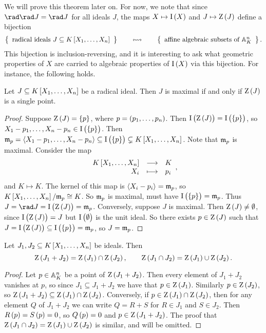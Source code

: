 
We will prove this theorem later on. For now, we note that since $ \rad \rad J = \rad J $ for all ideals $ J $, the maps $ X \mapsto \I\br{X} $ and $ J \mapsto \Z\br{J} $ define a bijection
$$ \correspondence{\text{radical ideals} \ J \subseteq K\sbr{X_1, \dots, X_n}}{\text{affine algebraic subsets of} \ \AA_K^n}. $$
This bijection is inclusion-reversing, and it is interesting to ask what geometric properties of $ X $ are carried to algebraic properties of $ \I\br{X} $ via this bijection. For instance, the following holds.

\begin{proposition}
Let $ J \subseteq K\sbr{X_1, \dots, X_n} $ be a radical ideal. Then $ J $ is maximal if and only if $ \Z\br{J} $ is a single point.
\end{proposition}

\begin{proof}
Suppose $ \Z\br{J} = \cbr{p} $, where $ p = \br{p_1, \dots, p_n} $. Then $ \I\br{\Z\br{J}} = \I\br{\cbr{p}} $, so $ X_1 - p_1, \dots, X_n - p_n \in \I\br{\cbr{p}} $. Then $ \mmm_p = \abr{X_1 - p_1, \dots, X_n - p_n} \subseteq \I\br{\cbr{p}} \subsetneq K\sbr{X_1, \dots, X_n} $. Note that $ \mmm_p $ is maximal. Consider the map
$$ \function{K\sbr{X_1, \dots, X_n}}{K}{X_i}{p_i}, $$
and $ K \mapsto K $. The kernel of this map is $ \abr{X_i - p_i} = \mmm_p $, so $ K\sbr{X_1, \dots, X_n} / \mmm_p \cong K $. So $ \mmm_p $ is maximal, must have $ \I\br{\cbr{p}} = \mmm_p $. Thus $ J = \rad J = \I\br{\Z\br{J}} = \mmm_p $. Conversely, suppose $ J $ is maximal. Then $ \Z\br{J} \ne \emptyset $, since $ \I\br{\Z\br{J}} = J $ but $ \I\br{\emptyset} $ is the unit ideal. So there exists $ p \in \Z\br{J} $ such that $ J = \I\br{\Z\br{J}} \subseteq \I\br{\cbr{p}} = \mmm_p $, so $ J = \mmm_p $.
\end{proof}

\begin{proposition}
Let $ J_1, J_2 \subseteq K\sbr{X_1, \dots, X_n} $ be ideals. Then
$$ \Z\br{J_1 + J_2} = \Z\br{J_1} \cap \Z\br{J_2}, \qquad \Z\br{J_1 \cap J_2} = \Z\br{J_1} \cup \Z\br{J_2}. $$
\end{proposition}

\begin{proof}
Let $ p \in \AA_K^n $ be a point of $ \Z\br{J_1 + J_2} $. Then every element of $ J_1 + J_2 $ vanishes at $ p $, so since $ J_1 \subseteq J_1 + J_2 $ we have that $ p \in \Z\br{J_1} $. Similarly $ p \in \Z\br{J_2} $, so $ \Z\br{J_1 + J_2} \subseteq \Z\br{J_1} \cap \Z\br{J_2} $. Conversely, if $ p \in \Z\br{J_1} \cap \Z\br{J_2} $, then for any element $ Q $ of $ J_1 + J_2 $ we can write $ Q = R + S $ for $ R \in J_1 $ and $ S \in J_2 $. Then $ R\br{p} = S\br{p} = 0 $, so $ Q\br{p} = 0 $ and $ p \in \Z\br{J_1 + J_2} $. The proof that $ \Z\br{J_1 \cap J_2} = \Z\br{J_1} \cup \Z\br{J_2} $ is similar, and will be omitted.
\end{proof}

